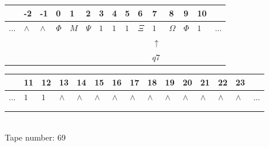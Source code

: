 \documentclass[11pt]{article}
\begin{document}
\begin{table}[H]
\centering
\begin{tabular}{lllllllllllllll}
 & -2 & -1 & 0 & 1 & 2 & 3 & 4 & 5 & 6 & 7 & 8 & 9 & 10 & \\
\hline
$...$ & \multicolumn{1}{|l|}{$\wedge$} & \multicolumn{1}{|l|}{$\wedge$} & \multicolumn{1}{|l|}{$\Phi$} & \multicolumn{1}{|l|}{$M$} & \multicolumn{1}{|l|}{$\Psi$} & \multicolumn{1}{|l|}{$1$} & \multicolumn{1}{|l|}{$1$} & \multicolumn{1}{|l|}{$1$} & \multicolumn{1}{|l|}{$\Xi$} & \multicolumn{1}{|l|}{$1$} & \multicolumn{1}{|l|}{$\Omega$} & \multicolumn{1}{|l|}{$\Phi$} & \multicolumn{1}{|l|}{$1$} & $...$\\
\hline
&  &  &  &  &  &  &  &  &  & $\uparrow$ &  &  &  &  \\
&  &  &  &  &  &  &  &  &  & $ q7 $ &  &  &  &  \\
\end{tabular}
\begin{tabular}{lllllllllllllll}
 & 11 & 12 & 13 & 14 & 15 & 16 & 17 & 18 & 19 & 20 & 21 & 22 & 23 & \\
\hline
$...$ & \multicolumn{1}{|l|}{$1$} & \multicolumn{1}{|l|}{$1$} & \multicolumn{1}{|l|}{$\wedge$} & \multicolumn{1}{|l|}{$\wedge$} & \multicolumn{1}{|l|}{$\wedge$} & \multicolumn{1}{|l|}{$\wedge$} & \multicolumn{1}{|l|}{$\wedge$} & \multicolumn{1}{|l|}{$\wedge$} & \multicolumn{1}{|l|}{$\wedge$} & \multicolumn{1}{|l|}{$\wedge$} & \multicolumn{1}{|l|}{$\wedge$} & \multicolumn{1}{|l|}{$\wedge$} & \multicolumn{1}{|l|}{$\wedge$} & $...$\\
\hline
&  &  &  &  &  &  &  &  &  &  &  &  &  &  \\
&  &  &  &  &  &  &  &  &  &  &  &  &  &  \\
\end{tabular}
\\
Tape number: 69
\noindent\makebox[\linewidth]{\hdashrule{\textwidth}{1pt}{1pt}}\end{table}
\end{document}
